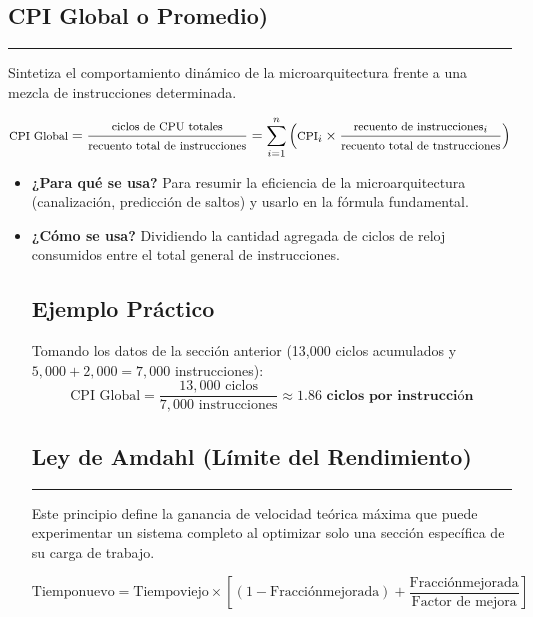 \documentclass[12pt,a4paper]{article}
\begin{document}
\begin{itemize}[leftmargin=*]
\begin{itemize}[leftmargin=*]
\begin{itemize}[leftmargin=*]
\section{\textbf{CPI Global o Promedio)}}
{\color{moradovivo}\hrule height 1pt} \vspace{0.3cm}
Sintetiza el comportamiento dinámico de la microarquitectura frente a una mezcla de instrucciones determinada.

\begin{tcolorbox}
\[
{\footnotesize
\text{CPI Global} = \frac{\text{ciclos de CPU totales}}{\text{recuento total de instrucciones}} = \sum_{i=1}^{n} \left( \text{CPI}_i \times \frac{\text{recuento de instrucciones}_i}{\text{recuento total de tnstrucciones}} \right)
}
\]
\end{tcolorbox}

\begin{itemize}[leftmargin=*]
    Esto es el valor promedio ponderado de ciclos de reloj requeridos por instrucción para un programa ejecutable concreto.
    \item \textbf{¿Para qué se usa?} Para resumir la eficiencia de la microarquitectura (canalización, predicción de saltos) y usarlo en la fórmula fundamental.
    \item \textbf{¿Cómo se usa?} Dividiendo la cantidad agregada de ciclos de reloj consumidos entre el total general de instrucciones.


\subsection*{Ejemplo Práctico}
Tomando los datos de la sección anterior (13,000 ciclos acumulados y $5,000 + 2,000 = 7,000$ instrucciones):
\[
\text{CPI Global} = \frac{13,000\text{ ciclos}}{7,000\text{ instrucciones}} \approx \mathbf{1.86\text{ ciclos por instrucción}}
\]

\section{\textbf{Ley de Amdahl (Límite del Rendimiento)}}
{\color{moradovivo}\hrule height 1pt} \vspace{0.3cm}
Este principio define la ganancia de velocidad teórica máxima que puede experimentar un sistema completo al optimizar solo una sección específica de su carga de trabajo.

\begin{tcolorbox}
\[
\text{Tiempo}{\text{nuevo}} = \text{Tiempo}{\text{viejo}} \times \left[ (1 - \text{Fracción}{\text{mejorada}}) + \frac{\text{Fracción}{\text{mejorada}}}{\text{Factor de mejora}} \right]
\]
\end{tcolorbox}


\end{itemize}
\end{itemize}
\end{itemize}
\end{itemize}
\end{document}
